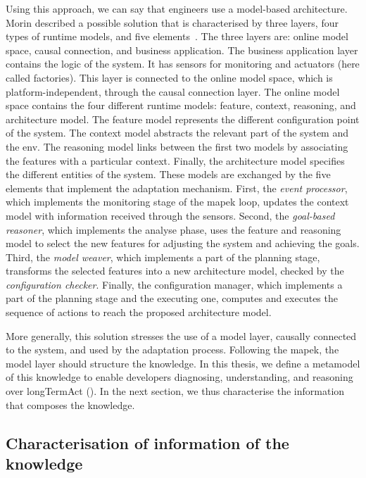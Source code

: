 Using this approach, we can say that engineers use a model-based architecture.
Morin \etal described a possible solution that is characterised by three layers, four types of runtime models, and five elements~\cite{DBLP:journals/computer/MorinBJFS09}.
The three layers are: online model space, causal connection, and business application.
The business application layer contains the logic of the system.
It has sensors for monitoring and actuators (here called factories).
This layer is connected to the online model space, which is platform-independent, through the causal connection layer.
The online model space contains the four different runtime models: feature, context, reasoning, and architecture model.
The feature model represents the different configuration point of the system.
The context model abstracts the relevant part of the system and the \gls{env}.
The reasoning model links between the first two models by associating the features with a particular context.
Finally, the architecture model specifies the different entities of the system.
These models are exchanged by the five elements that implement the adaptation mechanism.
First, the \textit{event processor}, which implements the monitoring stage of the \gls{mapek} loop, updates the context model with information received through the sensors.
Second, the \textit{goal-based reasoner}, which implements the analyse phase, uses the feature and reasoning model to select the new features for adjusting the system and achieving the goals.
Third, the \textit{model weaver}, which implements a part of the planning stage, transforms the selected features into a new architecture model, checked by the \textit{configuration checker}.
Finally, the configuration manager, which implements a part of the planning stage and the executing one, computes and executes the sequence of actions to reach the proposed architecture model.

More generally, this solution stresses the use of a model layer, causally connected to the system, and used by the adaptation process.
Following the \gls{mapek}, the model layer should structure the knowledge.
In this thesis, we define a metamodel of this knowledge to enable developers diagnosing, understanding, and reasoning over \gls{longTermAct} (\cf {}).
In the next section, we thus characterise the information that composes the knowledge.

\subsection{Characterisation of information of the knowledge}

